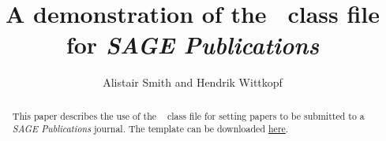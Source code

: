 \documentclass[Afour,sageh,times]{includes/tex/sagej}
\begin{document}


\newcommand\BibTeX{{\rmfamily B\kern-.05em \textsc{i\kern-.025em b}\kern-.08em
T\kern-.1667em\lower.7ex\hbox{E}\kern-.125emX}}

\def\volumeyear{2018}


\title{A demonstration of the \LaTeXe\ class file for 
\itshape{SAGE Publications}}

\author{Alistair Smith and Hendrik Wittkopf}




\begin{abstract}
This paper describes the use of the \LaTeXe\ \textsf{\journalclass} class file 
for setting papers to be submitted to a \textit{SAGE Publications} journal. The 
template can be downloaded 
\href{http://www.uk.sagepub.com/repository/binaries/SAGE LaTeX template.zip}{here}.
\end{abstract}

\end{document}
